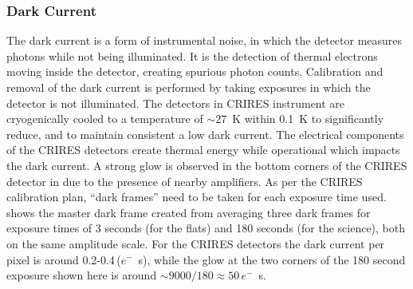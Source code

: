 \subsubsection{Dark Current}
\label{subsubsec:darkcurrent}
The dark current is a form of instrumental noise, in which the detector measures photons while not being illuminated. It is the detection of thermal electrons moving inside the detector, creating spurious photon counts. Calibration and removal of the dark current is performed by taking exposures in which the detector is not illuminated.
The detectors in CRIRES instrument are cryogenically cooled to a temperature of \(\sim 27\)~K within 0.1~K to significantly reduce, and to maintain consistent a low dark current. The electrical components of the CRIRES detectors create thermal energy while operational which impacts the dark current. A strong glow is observed in the bottom corners of the CRIRES detector in  due to the presence of nearby amplifiers. As per the CRIRES calibration plan, ``dark frames'' need to be taken for each exposure time used.  shows the master dark frame created from averaging three dark frames for exposure times of 3 seconds (for the flats) and 180 seconds (for the science), both on the same amplitude scale.
For the CRIRES detectors the dark current per pixel is around 0.2-0.4\,(\(e^{-}\)\si{\per\second}), while the glow at the two corners of the 180 second exposure shown here is around \(\sim9000 / 180\approx50\)\,\(e^{-}\)\si{\per\second}.

%


